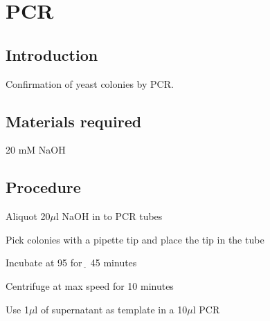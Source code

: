 \chapter{PCR}

\newpage
\setlength{\parindent}{0pt}
\setcounter{secnumdepth}{5}
\setcounter{section}{0}
\renewcommand*{\theHsection}{pcr.\the\value{section}}

\section{Introduction}
Confirmation of yeast colonies by PCR.
\section{Materials required}
	\begin{packed_enum}
	\item 20 mM NaOH
	\end{packed_enum}

\section{Procedure}
	\begin{packed_enum}
	\item Aliquot 20$\mu$l NaOH in to PCR tubes
	\item Pick colonies with a pipette tip and place the tip in the tube
	\item Incubate at {95\textcelsius} for  $_{\widetilde{~}}$ 45 minutes
	\item Centrifuge at max speed for 10 minutes
	\item Use 1$\mu$l of supernatant as template in a 10$ \mu $l PCR
	\end{packed_enum}
